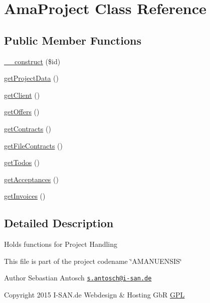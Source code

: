 \hypertarget{class_ama_project}{}\section{Ama\+Project Class Reference}
\label{class_ama_project}
\subsection*{Public Member Functions}
\begin{DoxyCompactItemize}
\item 
\hyperlink{class_ama_project_a1340871f436b81e1f225567b6cce4e79}{\+\_\+\+\_\+construct} (\$id)
\item 
\hyperlink{class_ama_project_a6e71e26a77f2e326be9dcb413d57cd56}{get\+Project\+Data} ()
\item 
\hyperlink{class_ama_project_a2f5f44fdf5404c87cc3a7b5719d85306}{get\+Client} ()
\item 
\hyperlink{class_ama_project_ad6b923f827d8f3110f54e6a251365259}{get\+Offers} ()
\item 
\hyperlink{class_ama_project_a1edd4b9b688a04f254580507f0652787}{get\+Contracts} ()
\item 
\hyperlink{class_ama_project_aa3ed1126f760cf244edcda9ccc9ed698}{get\+File\+Contracts} ()
\item 
\hyperlink{class_ama_project_a570b08ed9f427887c6a41dc854531fed}{get\+Todos} ()
\item 
\hyperlink{class_ama_project_a33dfa2e005957d6b91becb1024a8ae42}{get\+Acceptances} ()
\item 
\hyperlink{class_ama_project_a4a18c0abbf6628848d2c3b8c48fbca19}{get\+Invoices} ()
\end{DoxyCompactItemize}


\subsection{Detailed Description}
Holds functions for Project Handling

This file is part of the project codename \char`\"{}\+A\+M\+A\+N\+U\+E\+N\+S\+I\+S\char`\"{}

\begin{DoxyAuthor}{Author}
Sebastian Antosch \href{mailto:s.antosch@i-san.de}{\tt s.\+antosch@i-\/san.\+de} 
\end{DoxyAuthor}
\begin{DoxyCopyright}{Copyright}
2015 I-\/\+S\+A\+N.\+de Webdesign \& Hosting Gb\+R \hyperlink{}{G\+P\+L }
\end{DoxyCopyright}


